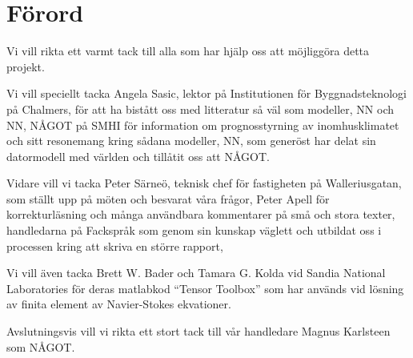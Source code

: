 \chapter*{Förord}


Vi vill rikta ett varmt tack till alla som har hjälp oss att möjliggöra detta projekt. 

Vi vill speciellt tacka Angela Sasic, lektor på Institutionen för Byggnadsteknologi på Chalmers, för att ha bistått oss med litteratur så väl som modeller, NN och NN, NÅGOT på SMHI för information om prognosstyrning av inomhusklimatet och sitt resonemang kring sådana modeller, NN, som generöst har delat sin datormodell med världen och tillåtit oss att NÅGOT.

Vidare vill vi tacka Peter Särneö, teknisk chef för fastigheten på Walleriusgatan, som ställt upp på möten och besvarat våra frågor, Peter Apell för korrekturläsning och många användbara kommentarer på små och stora texter, handledarna på Fackspråk som genom sin kunskap väglett och utbildat oss i processen kring att skriva en större rapport,

Vi vill även tacka Brett W. Bader och Tamara G. Kolda vid Sandia National Laboratories för deras
matlabkod ``Tensor Toolbox'' som har används vid lösning av finita element av Navier-Stokes ekvationer.

Avslutningsvis vill vi rikta ett stort tack till vår handledare Magnus Karlsteen som NÅGOT.


